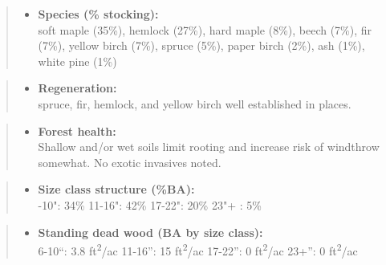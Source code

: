 \documentclass[]{tufte-handout}
\providecommand{\tightlist}{%
  \setlength{\itemsep}{0pt}\setlength{\parskip}{0pt}}
\begin{document}
\begin{quote}
\begin{itemize}
\tightlist
\item
  \textbf{Species (\% stocking):}\\
  \vspace{2pt} soft maple (35\%), hemlock (27\%), hard maple (8\%),
  beech (7\%), fir (7\%), yellow birch (7\%), spruce (5\%), paper birch
  (2\%), ash (1\%), white pine (1\%)
\end{itemize}
\end{quote}

\begin{quote}
\begin{itemize}
\tightlist
\item
  \textbf{Regeneration:}\\
  \vspace{2pt} spruce, fir, hemlock, and yellow birch well established
  in places.
\end{itemize}
\end{quote}

\begin{quote}
\begin{itemize}
\tightlist
\item
  \textbf{Forest health:}\\
  \vspace{2pt} Shallow and/or wet soils limit rooting and increase risk
  of windthrow somewhat. No exotic invasives noted.
\end{itemize}
\end{quote}

\begin{quote}
\begin{itemize}
\tightlist
\item
  \textbf{Size class structure (\%BA):}\\
  \vspace{2pt} -10": 34\% \textbar{} 11-16": 42\% \textbar{}
  17-22": 20\% \textbar{} 23"+ : 5\%
\end{itemize}
\end{quote}

\begin{quote}
\begin{itemize}
\tightlist
\item
  \textbf{Standing dead wood (BA by size class):}\\
  \vspace{2pt} \indent \small 6-10``: 3.8 ft\textsuperscript{2}/ac
  \textbar{} 11-16'': 15 ft\textsuperscript{2}/ac \textbar{} 17-22'': 0
  ft\textsuperscript{2}/ac \textbar{} 23+'': 0 ft\textsuperscript{2}/ac
\end{itemize}
\end{quote}
\end{document}
